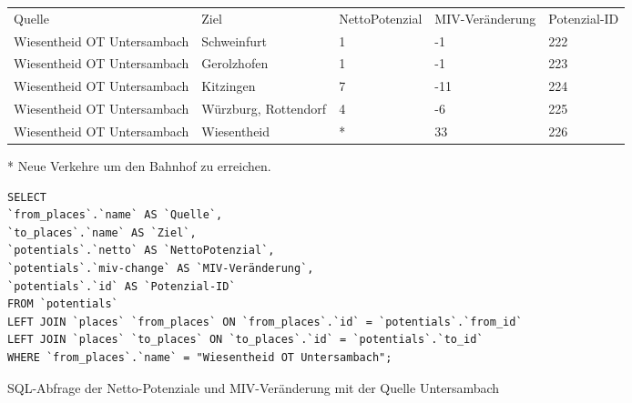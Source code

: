 \begin{tabularx}{\textwidth}{*5{X}}
Quelle & Ziel & NettoPotenzial & MIV-Veränderung & Potenzial-ID\\ 
Wiesentheid OT Untersambach & Schweinfurt & 1 & -1 & 222\\ 
Wiesentheid OT Untersambach & Gerolzhofen & 1 & -1 & 223\\ 
Wiesentheid OT Untersambach & Kitzingen & 7 & -11 & 224\\ 
Wiesentheid OT Untersambach & Würzburg, Rottendorf & 4 & -6 & 225\\ 
Wiesentheid OT Untersambach & Wiesentheid & * & 33 & 226\\ 
\end{tabularx}
\newline
\newline
* Neue Verkehre um den Bahnhof zu erreichen.
\newline
\begin{listing}[htbp]
\begin{verbatim}
SELECT
`from_places`.`name` AS `Quelle`, 
`to_places`.`name` AS `Ziel`, 
`potentials`.`netto` AS `NettoPotenzial`, 
`potentials`.`miv-change` AS `MIV-Veränderung`, 
`potentials`.`id` AS `Potenzial-ID`
FROM `potentials`
LEFT JOIN `places` `from_places` ON `from_places`.`id` = `potentials`.`from_id`
LEFT JOIN `places` `to_places` ON `to_places`.`id` = `potentials`.`to_id`
WHERE `from_places`.`name` = "Wiesentheid OT Untersambach";
\end{verbatim}
\caption{SQL-Abfrage der Netto-Potenziale und MIV-Veränderung mit der Quelle Untersambach}\label{lst-fz-untersambach}
\end{listing}